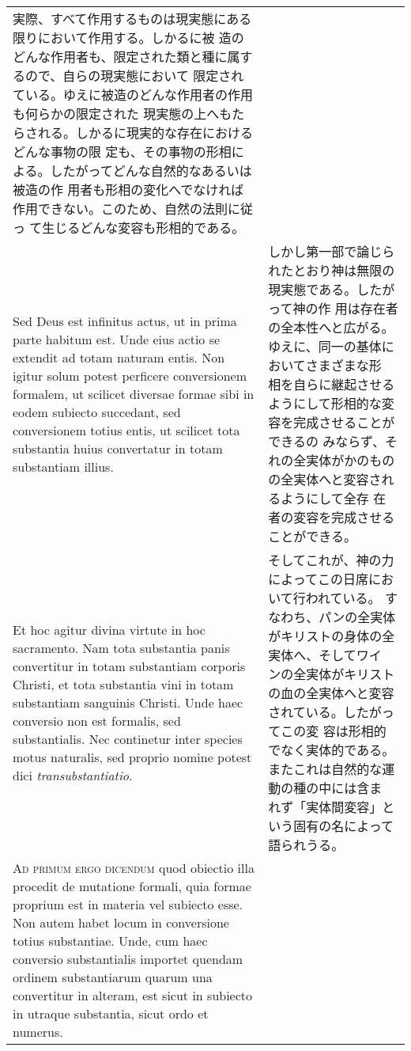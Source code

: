 \documentclass[10pt]{jsarticle} %
\begin{document}
\begin{longtable}{p{21em}p{21em}}
実際、すべて作用するものは現実態にある限りにおいて作用する。しかるに被
 造のどんな作用者も、限定された類と種に属するので、自らの現実態において
 限定されている。ゆえに被造のどんな作用者の作用も何らかの限定された
 現実態の上へもたらされる。しかるに現実的な存在におけるどんな事物の限
 定も、その事物の形相による。したがってどんな自然的なあるいは被造の作
 用者も形相の変化へでなければ作用できない。このため、自然の法則に従っ
 て生じるどんな変容も形相的である。


\\


Sed Deus est infinitus actus, ut in prima parte habitum
est. Unde eius actio se extendit ad totam naturam entis. Non igitur
solum potest perficere conversionem formalem, ut scilicet diversae
formae sibi in eodem subiecto succedant, sed conversionem totius
entis, ut scilicet tota substantia huius convertatur in totam
substantiam illius. 

&

しかし第一部で論じられたとおり神は無限の現実態である。したがって神の作
 用は存在者の全本性へと広がる。ゆえに、同一の基体においてさまざまな形
 相を自らに継起させるようにして形相的な変容を完成させることができるの
 みならず、それの全実体がかのものの全実体へと変容されるようにして全存
 在者の変容を完成させることができる。


\\



Et hoc agitur divina virtute in hoc
sacramento. Nam tota substantia panis convertitur in totam substantiam
corporis Christi, et tota substantia vini in totam substantiam
sanguinis Christi. Unde haec conversio non est formalis, sed
substantialis. Nec continetur inter species motus naturalis, sed
proprio nomine potest dici {\itshape transubstantiatio}.

&

そしてこれが、神の力によってこの日席において行われている。
すなわち、パンの全実体がキリストの身体の全実体へ、そしてワイ
 ンの全実体がキリストの血の全実体へと変容されている。したがってこの変
 容は形相的でなく実体的である。またこれは自然的な運動の種の中には含ま
 れず「実体間変容」という固有の名によって語られうる。


\\



{\scshape Ad primum ergo dicendum} quod obiectio illa procedit de mutatione
formali, quia formae proprium est in materia vel subiecto esse. Non
autem habet locum in conversione totius substantiae. Unde, cum haec
conversio substantialis importet quendam ordinem substantiarum quarum
una convertitur in alteram, est sicut in subiecto in utraque
substantia, sicut ordo et numerus.


\end{longtable}
\end{document}
